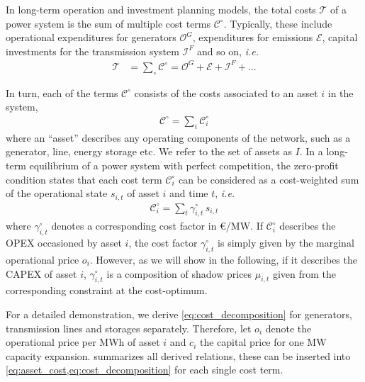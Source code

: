\documentclass[11pt,twocolumn]{article}
\newcommand{\ie}{\textit{i.e.} }
\newcommand{\state}[1][i]{s_{#1,t}}
\newcommand{\costfactor}{\gamma^\circ_{i,t}}
\newcommand{\totalcost}{\mathcal{T}}
\newcommand{\cost}[1][\circ]{\mathcal{C}^{#1}}
\newcommand{\opexgeneration}{\mathcal{O}^G}
\newcommand{\capexflow}{\mathcal{I}^F}
\newcommand{\emissioncost}{\mathcal{E}}
\begin{document}
In long-term operation and investment planning models, the total costs $\totalcost$ of a power system is the sum of multiple cost terms $\cost$. Typically, these include operational expenditures for generators $\opexgeneration$, expenditures for emissions $\emissioncost$,  capital investments for the transmission system $\capexflow$ and so on, \ie
\begin{align}
\totalcost &= \sum_\circ \cost = \opexgeneration + \emissioncost +  \capexflow + ...
\label{eq:total_cost}
\end{align}

In turn, each of the terms $\cost$ consists of the costs associated to an asset $i$ in the system, 
\begin{align}
    \cost = \sum_{i} \cost_{i}
    \label{eq:asset_cost}
\end{align} 
where an ``asset'' describes any operating components of the network, such as a generator, line, energy storage etc. We refer to the set of assets as $I$. 
In a long-term equilibrium of a power system with perfect competition, the zero-profit condition states that each cost term $\cost_{i}$ can be considered as a cost-weighted sum of the operational state $s_{i,t}$ of asset $i$ and time $t$, \ie
\begin{align}
    \cost_{i} = \sum_t  \costfactor \, \state
    \label{eq:cost_decomposition}
\end{align}
where $\costfactor$ denotes a corresponding cost factor in \euro/MW. 
If $\cost_i$ describes the OPEX occasioned by asset $i$, the cost factor $\costfactor$ is simply given by the marginal operational price $o_i$. However, as we will show in the following, if it describes the CAPEX of asset $i$, $\costfactor$ is a composition of shadow prices $\mu_{i,t}$ given from the corresponding constraint at the cost-optimum. 

For a detailed demonstration, we derive  \cref{eq:cost_decomposition} for generators, transmission lines and storages separately. Therefore, let $o_i$ denote the operational price per MWh of asset $i$ and $c_i$ the capital price for one MW capacity expansion.  summarizes all derived relations, these can be inserted into \cref{eq:asset_cost,eq:cost_decomposition} for each single cost term.
\end{document}
